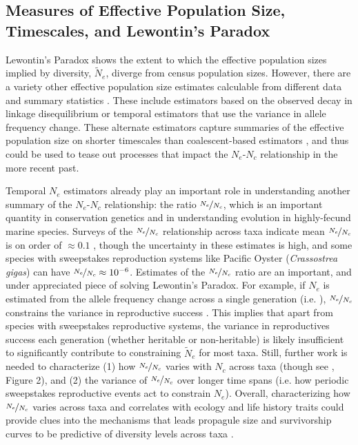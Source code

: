 \documentclass[11pt]{article}
\begin{document}
\subsection*{Measures of Effective Population Size, Timescales, and Lewontin's Paradox}

Lewontin's Paradox shows the extent to which the effective population sizes
implied by diversity, $\widetilde{N}_e$, diverge from census population sizes.
However, there are a variety other effective population size estimates
calculable from different data and summary statistics
\parencite{Wang2016-mi,Caballero1994-ao,Caballero2020-wm,Galtier2020-fb}. These
include estimators based on the observed decay in linkage disequilibrium or
temporal estimators that use the variance in allele frequency change. These
alternate estimators capture summaries of the effective population size on
shorter timescales than coalescent-based estimators \parencite{Wang2005-wy},
and thus could be used to tease out processes that impact the $N_e$-$N_c$
relationship in the more recent past. 

Temporal $N_e$ estimators already play an important role in understanding
another summary of the $N_e$-$N_c$ relationship: the ratio
$\nicefrac{N_e}{N_c}$, which is an important quantity in conservation genetics
\parencite{Frankham1995-xz,Mace1991-ai} and in understanding evolution in
highly-fecund marine species. Surveys of the $\nicefrac{N_e}{N_c}$ relationship
across taxa indicate mean $\nicefrac{N_e}{N_c}$ is on order of $\approx 0.1$
\parencite{Frankham1995-xz,Palstra2008-rt,Palstra2012-vy}, though the
uncertainty in these estimates is high, and some species with sweepstakes
reproduction systems like Pacific Oyster (\emph{Crassostrea gigas}) can have
$\nicefrac{N_e}{N_c} \approx 10^{-6}$. Estimates of the $\nicefrac{N_e}{N_c}$
ratio are an important, and under appreciated piece of solving Lewontin's
Paradox. For example, if $N_e$ is estimated from the allele frequency change
across a single generation (i.e. \cite{Waples1989-sj}), $\nicefrac{N_e}{N_c}$
constrains the variance in reproductive success
\parencite{Wright1938-tv,Nunney1993-ef,Nunney1996-wy}. This implies that apart
from species with sweepstakes reproductive systems, the variance in
reproductives success each generation (whether heritable or non-heritable) is
likely insufficient to significantly contribute to constraining
$\widetilde{N}_e$ for most taxa. Still, further work is needed to characterize
(1) how $\nicefrac{N_e}{N_c}$ varies with $N_c$ across taxa (though see
\cite{Palstra2012-vy}, Figure 2), and (2) the variance of $\nicefrac{N_e}{N_c}$
over longer time spans (i.e. how periodic sweepstakes reproductive events act
to constrain $N_e$). Overall, characterizing how $\nicefrac{N_e}{N_c}$ varies
across taxa and correlates with ecology and life history traits could provide
clues into the mechanisms that leads propagule size and survivorship curves to
be predictive of diversity levels across taxa
\parencite{Romiguier2014-bp,Hallatschek2018-iu,Barry2020-pp}.
\end{document}
